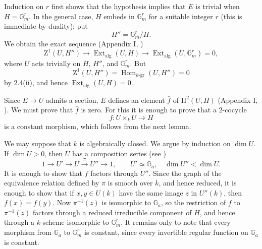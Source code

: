 

Induction on \(r\) first shows that the hypothesis implies that
\(E\) is trivial when \(H=\mathbb G_m^r\).  In the general case,
\(H\) embeds in \(\mathbb G_m^r\) for a suitable integer \(r\)
(this is immediate by duality); put
\[
  H''=\mathbb G_m^r/H.
\]
We obtain the exact sequence (Appendix I, )
\[
  \mathrm Z^1(U,H'')
    \longrightarrow\operatorname{Ext}_{\mathrm{alg}}(U,H)
    \longrightarrow
      \operatorname{Ext}_{\mathrm{alg}}(U,\mathbb G_m^r)=0,
\]
where \(U\) acts trivially on \(H\), \(H''\), and
\(\mathbb G_m^r\).  But
\[
  \mathrm Z^1(U,H'')
    =\operatorname{Hom}_{k\text{-}\mathrm{gr}}(U,H'')=0
\]
by 2.4(ii), and hence
\(\operatorname{Ext}_{\mathrm{alg}}(U,H)=0\).

Since \(E\longrightarrow U\) admits a section, \(E\) defines an
element \(\bar f\) of \(\mathrm H^2(U,H)\) (Appendix I, ).  We must
prove that \(\bar f\) is zero.  For this it is enough to prove that a
\(2\)-cocycle
\[
  f:U\times_kU\longrightarrow H
\]
is a constant morphism, which follows from the next lemma.


We may suppose that \(k\) is algebraically closed.  We argue by
induction on \(\dim U\).  If \(\dim U>0\), then \(U\) has a
composition series (see )
\[
  1\longrightarrow U'\longrightarrow U
    \xrightarrow{\ \pi\ }U''\longrightarrow1,
  \qquad
  U'\simeq\mathbb G_a,\quad \dim U''<\dim U.
\]
It is enough to show that \(f\) factors through \(U''\).  Since
the graph of the equivalence relation defined by \(\pi\) is
smooth over \(k\), and hence reduced, it is enough to show that
if \(x,y\in U(k)\) have the same image \(z\) in \(U''(k)\), then
\(f(x)=f(y)\).  Now \(\pi^{-1}(z)\) is isomorphic to
\(\mathbb G_a\), so the restriction of \(f\) to
\(\pi^{-1}(z)\) factors through a reduced irreducible component
of \(H\), and hence through a \(k\)-scheme isomorphic to
\(\mathbb G_m^r\).  It remains only to note that every morphism
from \(\mathbb G_a\) to \(\mathbb G_m^r\) is constant, since
every invertible regular function on \(\mathbb G_a\) is
constant.


